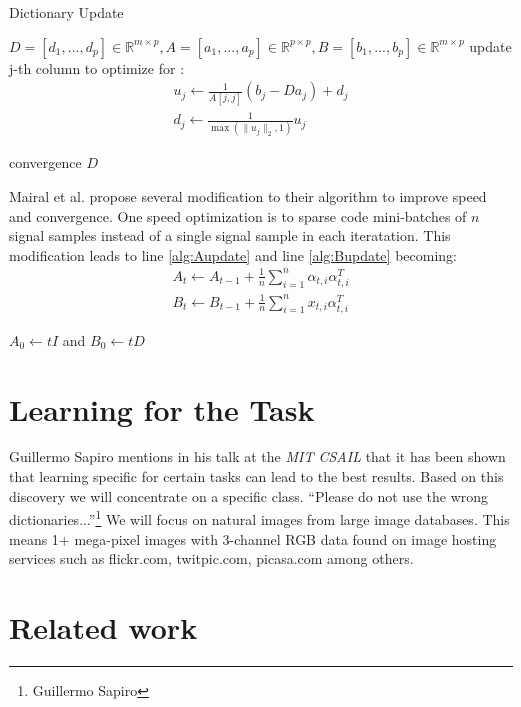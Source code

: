 \begin{algorithm}[H]
\caption{Dictionary Update}
\label{alg:update}
\begin{algorithmic}[1]
\REQUIRE $D=[d_1,...,d_p] \in \mathbb{R}^{m \times p}, A=[a_1,...,a_p] \in \mathbb{R}^{p \times p}, B=[b_1,...,b_p] \in \mathbb{R}^{m \times p}$
\REPEAT
{}
\STATE update j-th column to optimize for :
\begin{align*}
u_j \gets \frac{1}{A[j,j]}\left(b_j-Da_j\right)+d_j \\
d_j \gets \frac{1}{\max\left(\lVert u_j \rVert_2,1\right)} u_j
\end{align*}

\ENDFOR
\UNTIL convergence 
\RETURN $D$
\end{algorithmic}
\end{algorithm}
Mairal et al. propose several modification to their algorithm to improve speed
and convergence. One speed optimization is to sparse code mini-batches of $n$
signal samples instead of a single signal sample in each iteratation. This
modification leads to line \ref{alg:Aupdate} and line \ref{alg:Bupdate}
becoming:
\begin{align}
A_t \gets A_{t-1} + \frac{1}{n}\sum_{i=1}^{n}\alpha_{t,i}\alpha_{t,i}^T\\
B_t \gets B_{t-1} + \frac{1}{n}\sum_{i=1}^{n}x_{t,i}\alpha_{t,i}^T
\end{align}

$A_0  \gets tI$ and $B_0 \gets tD$




\section{Learning for the Task}
\label{sec:learnForTheTask}
Guillermo Sapiro mentions in his talk\cite{sapiroSlides} at the \emph{MIT CSAIL}
that it has been shown that learning specific for certain tasks can lead to the
best results.  Based on this discovery we will concentrate on a specific class. 
``Please do not use the wrong dictionaries...''\footnote{Guillermo Sapiro}
We will focus on natural images from large image databases. This means 1+
mega-pixel images with 3-channel RGB data found on image hosting services such
as flickr.com, twitpic.com, picasa.com among others.


\section{Related work}
\label{sec:related_dictionarie}

